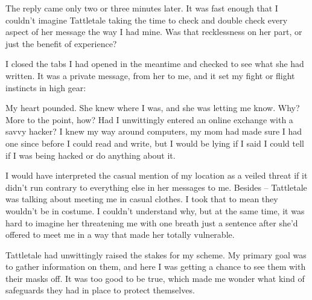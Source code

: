 The reply came only two or three minutes later.  It was fast enough that I couldn't imagine Tattletale taking the time to check and double check every aspect of her message the way I had mine.  Was that recklessness on her part, or just the benefit of experience?



I closed the tabs I had opened in the meantime and checked to see what she had written.  It was a private message, from her to me, and it set my fight or flight instincts in high gear:




My heart pounded.  She knew where I was, and she was letting me know.  Why?  More to the point, how?  Had I unwittingly entered an online exchange with a savvy hacker?  I knew my way around computers, my mom had made sure I had one since before I could read and write, but I would be lying if I said I could tell if I was being hacked or do anything about it.



I would have interpreted the casual mention of my location as a veiled threat if it didn't run contrary to everything else in her messages to me.  Besides – Tattletale was talking about meeting me in casual clothes.  I took that to mean they wouldn't be in costume.  I couldn't understand why, but at the same time, it was hard to imagine her threatening me with one breath just a sentence after she'd offered to meet me in a way that made her totally vulnerable.



Tattletale had unwittingly raised the stakes for my scheme.  My primary goal was to gather information on them, and here I was getting a chance to see them with their masks off.  It was too good to be true, which made me wonder what kind of safeguards they had in place to protect themselves.



